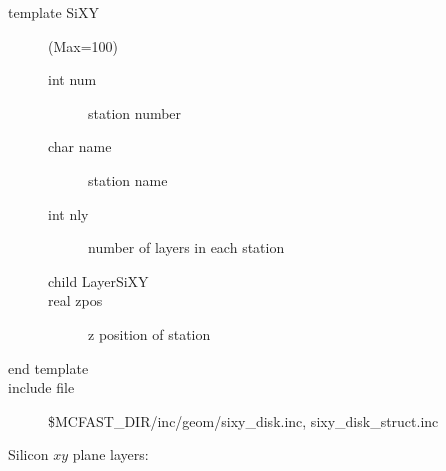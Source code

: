 \begin{description}
\item[{\rm template} SiXY](Max=100)
\begin{description}
\item[{\rm  int} num]  station number
\item[{\rm  char} name]  station name
\item[{\rm  int} nly]   number of layers in each station
\item[{\rm  child} LayerSiXY]
\item[{\rm  real} zpos]  z position of station
\end{description}
\item[end template]
\item[include file] \$MCFAST\_DIR/inc/geom/sixy\_disk.inc, sixy\_disk\_struct.inc 
\end{description}
Silicon $xy$ plane layers:
